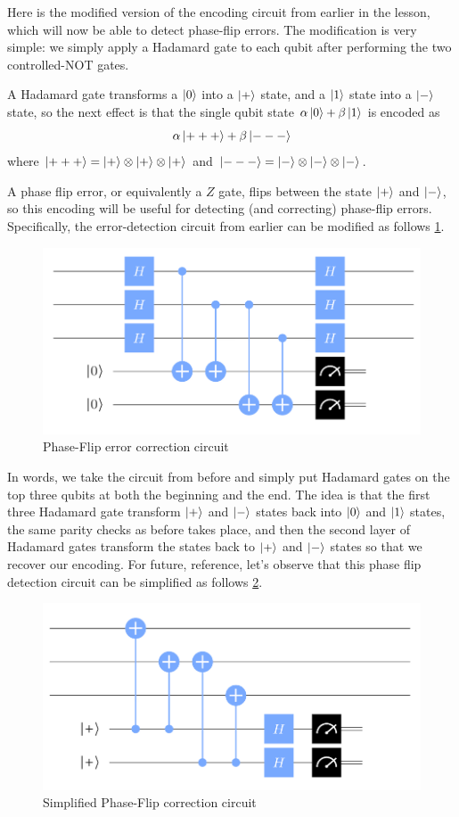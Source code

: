 \documentclass[12pt, oneside]{book}
\theoremstyle{definition}
\theoremstyle{definition}
\theoremstyle{remark}
\begin{document}
Here is the modified version of the encoding circuit from earlier in the lesson, which will now be able to detect phase-flip errors. The modification is very simple: we simply apply a Hadamard gate to each qubit after performing the two controlled-NOT gates.

A Hadamard gate transforms a $\ket{0}$ into a $\ket{+}$ state, and a $\ket{1}$ state into a $\ket{-}$ state, so the next effect is that the single qubit state $\alpha\ket{0}+\beta\ket{1}$ is encoded as
\[
\alpha\ket{+++}+\beta\ket{---}
\]
where $\ket{+++}=\ket{+}\otimes \ket{+}\otimes \ket{+}$ and $\ket{---}=\ket{-}\otimes\ket{-}\otimes\ket{-}$.

A phase flip error, or equivalently a $Z$ gate, flips between the state $\ket{+}$ and $\ket{-}$, so this encoding will be useful for detecting (and correcting) phase-flip errors. Specifically, the error-detection circuit from earlier can be modified as follows \ref{fig:phasefliperr}.
\begin{figure}[ht]
    \centering
    \includegraphics[width=1\linewidth]{Images/phasefliperr.png}
    \caption{Phase-Flip error correction circuit}
    \label{fig:phasefliperr}
\end{figure}
In words, we take the circuit from before and simply put Hadamard gates on the top three qubits at both the beginning and the end. The idea is that the first three Hadamard gate transform $\ket{+}$ and $\ket{-}$ states back into $\ket{0}$ and $\ket{1}$ states, the same parity checks as before takes place, and then the second layer of Hadamard gates transform the states back to $\ket{+}$ and $\ket{-}$ states so that we recover our encoding. For future, reference, let's observe that this phase flip detection circuit can be simplified as follows \ref{fig:phase-fliperr}.
\begin{figure}[ht]
    \centering
    \includegraphics[width=1\linewidth]{Images/phasefliperrorcirc.png}
    \caption{Simplified Phase-Flip correction circuit}
    \label{fig:phase-fliperr}
\end{figure}
\end{document}
